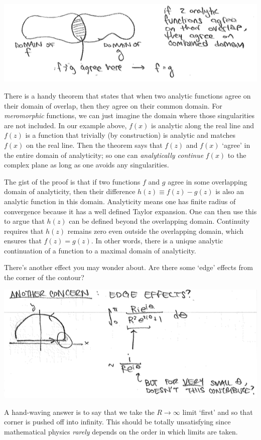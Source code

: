 \begin{center}
\includegraphics[width=.9\textwidth]{figures/Lec_2017_14_analytic_continuation.png}
\end{center}
There is a handy theorem that states that when two analytic functions agree on their domain of overlap, then they agree on their common domain. For \emph{meromorphic} functions, we can just imagine the domain where those singularities are not included. In our example above, $f(x)$ is analytic along the real line and $f(z)$ is a function that trivially (by construction) is analytic and matches $f(x)$ on the real line. Then the theorem says that $f(z)$ and $f(x)$ `agree' in the entire domain of analyticity; so one can \emph{analytically continue} $f(x)$ to the complex plane as long as one avoids any singularities.

The gist of the proof is that if two functions $f$ and  $g$ agree in some overlapping domain of analyticity, then their difference $h(z)\equiv f(z)-g(z)$ is also an analytic function in this domain. Analyticity means one has finite radius of convergence because it has a well defined Taylor expansion. One can then use this to argue that $h(z)$ can be defined beyond the overlapping domain. Continuity requires that $h(z)$ remains zero even outside the overlapping domain, which ensures that $f(z)=g(z)$. In other words, there is a unique analytic continuation of a function to a maximal domain of analyticity.

There's another effect you may wonder about. Are there some `edge' effects from the corner of the contour?
\begin{center}
\includegraphics[width=.9\textwidth]{figures/Lec_2017_corner.png}
\end{center}
A hand-waving answer is to say that we take the $R\to\infty$ limit `first' and so that corner is pushed off into infinity. This should be totally unsatisfying since mathematical physics \emph{rarely} depends on the order in which limits are taken. 

